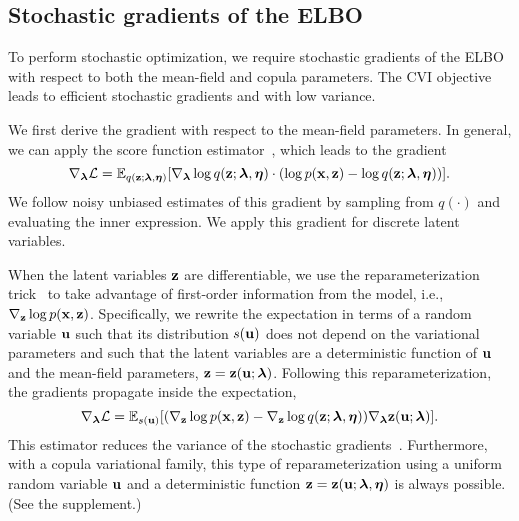 \subsection{Stochastic gradients of the \gls{ELBO}}
\label{subsec:derivatives}

To perform stochastic optimization, we require stochastic gradients of
the \gls{ELBO} with respect to both the mean-field and copula
parameters. The \gls{CVI} objective leads to efficient stochastic
gradients and with low variance.

We first derive the gradient with respect to the mean-field
parameters.  In general, we can apply the score function
estimator~\citep{ranganath2014black}, which leads to the gradient
\begin{equation}
\nabla_{\boldsymbol{\mathbf{\lambda}}}\mathcal{L} = \mathbb{E}_{q(\boldsymbol{\mathbf{z}};\boldsymbol{\mathbf{\lambda}},\boldsymbol{\mathbf{\eta}})}[\nabla_{\boldsymbol{\mathbf{\lambda}}}\log
q(\boldsymbol{\mathbf{z}};\boldsymbol{\mathbf{\lambda}},\boldsymbol{\mathbf{\eta}})\cdot(\log p(\boldsymbol{\mathbf{x}},\boldsymbol{\mathbf{z}})-\log
q(\boldsymbol{\mathbf{z}};\boldsymbol{\mathbf{\lambda}},\boldsymbol{\mathbf{\eta}}))].
\label{eq:grad_elbo}
\end{equation}
We follow noisy unbiased estimates of this gradient by sampling from
$q(\cdot)$ and evaluating the inner expression.  We apply this gradient for
discrete latent variables.

When the latent variables $\boldsymbol{\mathbf{z}}$ are differentiable, we use the
reparameterization trick~\citep{rezende2014stochastic} to take advantage of first-order
information from the model, i.e.,$\nabla_{\boldsymbol{\mathbf{z}}} \log p(\boldsymbol{\mathbf{x}},\boldsymbol{\mathbf{z}})$.
Specifically, we rewrite the expectation in terms of a random variable
$\boldsymbol{\mathbf{u}}$ such that its distribution $s(\boldsymbol{\mathbf{u}})$ does not depend on the
variational parameters and such that the latent variables are a
deterministic function of $\boldsymbol{\mathbf{u}}$ and the mean-field parameters,
$\boldsymbol{\mathbf{z}}=\boldsymbol{\mathbf{z}}(\boldsymbol{\mathbf{u}};\boldsymbol{\mathbf{\lambda}})$. Following this reparameterization, the
gradients propagate inside the expectation,
\begin{equation}
  \nabla_{\boldsymbol{\mathbf{\lambda}}}\mathcal{L} =
  \mathbb{E}_{s(\boldsymbol{\mathbf{u}})}[(\nabla_{\boldsymbol{\mathbf{z}}}\log
  p(\boldsymbol{\mathbf{x}},\boldsymbol{\mathbf{z}})-\nabla_{\boldsymbol{\mathbf{z}}}\log
  q(\boldsymbol{\mathbf{z}};\boldsymbol{\mathbf{\lambda}},\boldsymbol{\mathbf{\eta}}))\nabla_{\boldsymbol{\mathbf{\lambda}}}\boldsymbol{\mathbf{z}}(\boldsymbol{\mathbf{u}};\boldsymbol{\mathbf{\lambda}})].
\label{eq:grad_meanfield:reinforce}
\end{equation}
This estimator reduces the variance of the stochastic
gradients~\citep{rezende2014stochastic}.
Furthermore, with a copula variational family, this type of
reparameterization using a uniform random variable $\boldsymbol{\mathbf{u}}$ and a deterministic function $\boldsymbol{\mathbf{z}}=\boldsymbol{\mathbf{z}}(\boldsymbol{\mathbf{u}};\boldsymbol{\mathbf{\lambda}},\boldsymbol{\mathbf{\eta}})$ is always possible. (See the supplement.)

